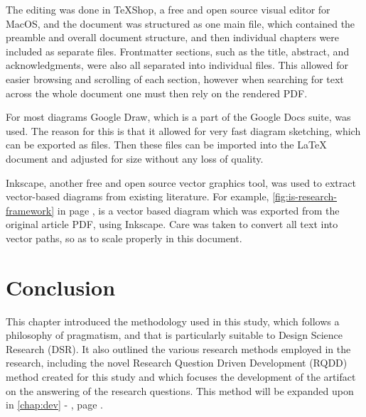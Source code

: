 The editing was done in TeXShop, a free and open source visual editor for MacOS, and the document was structured as one main file, which contained the preamble and overall document structure, and then individual chapters were included as separate files. Frontmatter sections, such as the title, abstract, and acknowledgments, were also all separated into individual files. This allowed for easier browsing and scrolling of each section, however when searching for text across the whole document one must then rely on the rendered PDF.

For most diagrams Google Draw, which is a part of the Google Docs suite, was used. The reason for this is that it allowed for very fast diagram sketching, which can be exported as  files. Then these files can be imported into the LaTeX document and adjusted for size without any loss of quality.

Inkscape, another free and open source vector graphics tool, was used to extract vector-based diagrams from existing literature. For example, \autoref{fig:is-research-framework} in page \pageref{fig:is-research-framework}, is a vector based diagram which was exported from the original article PDF, using Inkscape. Care was taken to convert all text into vector paths, so as to scale properly in this document.

\section{Conclusion}

This chapter introduced the methodology used in this study, which follows a philosophy of pragmatism, and that is particularly suitable to Design Science Research (DSR). It also outlined the various research methods employed in the research, including the novel Research Question Driven Development (RQDD) method created for this study and which focuses the development of the artifact on the answering of the research questions. This method will be expanded upon in \autoref{chap:dev} - , page \pageref{chap:dev}.